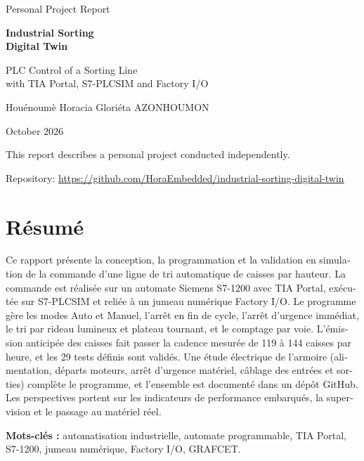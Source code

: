 \documentclass[11pt,a4paper]{report}
\newcommand{\AuthorName}{Houénoumè Horacia Gloriéta AZONHOUMON}
\newcommand{\frontsection}[1]{\phantomsection\section*{#1}\addcontentsline{toc}{chapter}{#1}}
\begin{document}

\begin{titlepage}
\thispagestyle{empty}
\centering
\vspace*{1.5cm}
{\sffamily\large Personal Project Report\par}
\vspace{2.2cm}
{\sffamily\bfseries\fontsize{28}{34}\selectfont Industrial Sorting\\ Digital Twin\par}
\vspace{0.8cm}
{\sffamily\Large PLC Control of a Sorting Line\\ with TIA Portal, S7-PLCSIM and Factory I/O\par}
\vspace{3cm}
{\Large \AuthorName\par}
\vspace{0.6cm}
{\large October 2026\par}
\vfill
{\small This report describes a personal project conducted independently.\par}
\vspace{0.3cm}
{\footnotesize Repository: \url{https://github.com/HoraEmbedded/industrial-sorting-digital-twin}\par}
\end{titlepage}

\pagestyle{plain}

\frontsection{Résumé}
\begin{otherlanguage}{french}
Ce rapport présente la conception, la programmation et la validation en simulation de la commande d'une ligne de tri automatique de caisses par hauteur. La commande est réalisée sur un automate Siemens S7-1200 avec TIA Portal, exécutée sur S7-PLCSIM et reliée à un jumeau numérique Factory I/O. Le programme gère les modes Auto et Manuel, l'arrêt en fin de cycle, l'arrêt d'urgence immédiat, le tri par rideau lumineux et plateau tournant, et le comptage par voie. L'émission anticipée des caisses fait passer la cadence mesurée de 119 à 144 caisses par heure, et les 29 tests définis sont validés. Une étude électrique de l'armoire (alimentation, départs moteurs, arrêt d'urgence matériel, câblage des entrées et sorties) complète le programme, et l'ensemble est documenté dans un dépôt GitHub. Les perspectives portent sur les indicateurs de performance embarqués, la supervision et le passage au matériel réel.

\medskip\noindent\textbf{Mots-clés :} automatisation industrielle, automate programmable, TIA Portal, S7-1200, jumeau numérique, Factory I/O, GRAFCET.
\end{otherlanguage}
\end{document}
